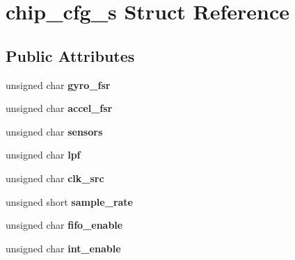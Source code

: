 \hypertarget{structchip__cfg__s}{}\section{chip\+\_\+cfg\+\_\+s Struct Reference}
\label{structchip__cfg__s}
\subsection*{Public Attributes}
\begin{DoxyCompactItemize}
\item 
\hypertarget{group___d_r_i_v_e_r_s_gab45a727aeee17380828a3e20ccb375c2}{}unsigned char {\bfseries gyro\+\_\+fsr}\label{group___d_r_i_v_e_r_s_gab45a727aeee17380828a3e20ccb375c2}

\item 
\hypertarget{group___d_r_i_v_e_r_s_gaf66873be1446ed552812e32d40eced61}{}unsigned char {\bfseries accel\+\_\+fsr}\label{group___d_r_i_v_e_r_s_gaf66873be1446ed552812e32d40eced61}

\item 
\hypertarget{group___d_r_i_v_e_r_s_gaa996fc14aa630e53823462baf460c13f}{}unsigned char {\bfseries sensors}\label{group___d_r_i_v_e_r_s_gaa996fc14aa630e53823462baf460c13f}

\item 
\hypertarget{group___d_r_i_v_e_r_s_ga16ec8ca8298f62ac01419775377270fb}{}unsigned char {\bfseries lpf}\label{group___d_r_i_v_e_r_s_ga16ec8ca8298f62ac01419775377270fb}

\item 
\hypertarget{group___d_r_i_v_e_r_s_gab7bd5165d6e62cb0d814cf3401958445}{}unsigned char {\bfseries clk\+\_\+src}\label{group___d_r_i_v_e_r_s_gab7bd5165d6e62cb0d814cf3401958445}

\item 
\hypertarget{group___d_r_i_v_e_r_s_ga2660470fcf7b53e2e832a397cbe6c354}{}unsigned short {\bfseries sample\+\_\+rate}\label{group___d_r_i_v_e_r_s_ga2660470fcf7b53e2e832a397cbe6c354}

\item 
\hypertarget{group___d_r_i_v_e_r_s_ga88143c31b894bcd819c0e49b0ff267aa}{}unsigned char {\bfseries fifo\+\_\+enable}\label{group___d_r_i_v_e_r_s_ga88143c31b894bcd819c0e49b0ff267aa}

\item 
\hypertarget{group___d_r_i_v_e_r_s_gaa366c36057f31e6e0d4cf2ca4a1ef52f}{}unsigned char {\bfseries int\+\_\+enable}\label{group___d_r_i_v_e_r_s_gaa366c36057f31e6e0d4cf2ca4a1ef52f}


\end{DoxyCompactItemize}
